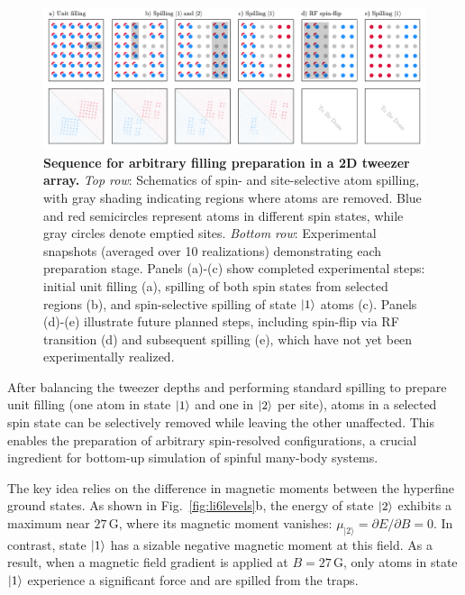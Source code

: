 
\begin{figure}
    \centering
    \includegraphics{fig-ai/preparation-array-ai.pdf}
    \caption[Sequence for arbitrary filling preparation in a 2D tweezer array]{
    \textbf{Sequence for arbitrary filling preparation in a 2D tweezer array.}
    \textit{Top row}: Schematics of spin- and site-selective atom spilling, with gray shading indicating regions where atoms are removed. Blue and red semicircles represent atoms in different spin states, while gray circles denote emptied sites.
    \textit{Bottom row}: Experimental snapshots (averaged over 10 realizations) demonstrating each preparation stage. Panels (a)-(c) show completed experimental steps: initial unit filling (a), spilling of both spin states from selected regions (b), and spin-selective spilling of state $\left| 1 \right\rangle$ atoms (c). Panels (d)-(e) illustrate future planned steps, including spin-flip via RF transition (d) and subsequent spilling (e), which have not yet been experimentally realized.
    }
    \label{fig:preparation-array}
\end{figure}




After balancing the tweezer depths and performing standard spilling to prepare unit filling (one atom in state $\left| 1 \right\rangle$ and one in $\left| 2 \right\rangle$ per site), atoms in a selected spin state can be selectively removed while leaving the other unaffected. This enables the preparation of arbitrary spin-resolved configurations, a crucial ingredient for bottom-up simulation of spinful many-body systems.

The key idea relies on the difference in magnetic moments between the hyperfine ground states. As shown in Fig.~\ref{fig:li6levels}b, the energy of state $\left| 2 \right\rangle$ exhibits a maximum near $27\,\mathrm{G}$, where its magnetic moment vanishes: $\mu_{|2\rangle} = \partial E / \partial B = 0$. In contrast, state $\left| 1 \right\rangle$ has a sizable negative magnetic moment at this field.
As a result, when a magnetic field gradient is applied at $B = 27\,\mathrm{G}$, only atoms in state $\left| 1 \right\rangle$ experience a significant force and are spilled from the traps.

